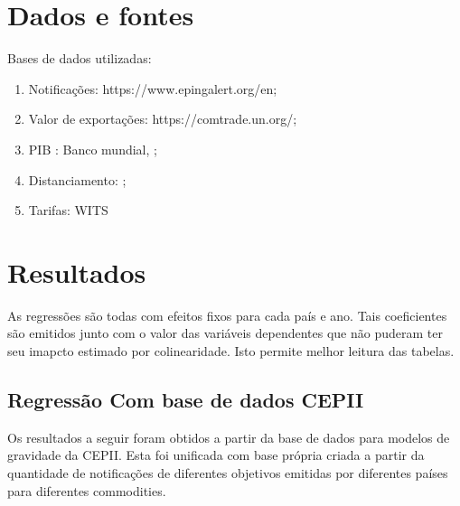 \documentclass[12pt, a4paper]{article}
\begin{document}
\section{Dados e fontes}

Bases de dados utilizadas:

\begin{enumerate}
    \item Notificações: https://www.epingalert.org/en;
    \item Valor de exportações: https://comtrade.un.org/;
    \item PIB : Banco mundial, \cite{WB};
    \item Distanciamento: \cite{CEPII};
    \item Tarifas: WITS
\end{enumerate}

\section{Resultados}

As regressões são todas com efeitos fixos para cada país e ano. Tais coeficientes são emitidos junto com o valor das variáveis dependentes que não puderam ter seu imapcto estimado por colinearidade. Isto permite melhor leitura das tabelas.
\subsection{Regressão Com base de dados CEPII}

Os resultados a seguir foram obtidos a partir da base de dados para modelos de gravidade da CEPII. Esta foi unificada com base própria criada a partir da quantidade de notificações de diferentes objetivos emitidas por diferentes países para diferentes commodities.



\printbibliography
\end{document}
